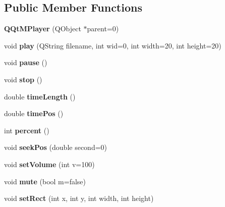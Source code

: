 \subsection*{Public Member Functions}
\begin{DoxyCompactItemize}
\item 
\mbox{\label{class_q_qt_m_player_aa986e3429a00ee30129d2acfa8f0755d}} 
{\bfseries Q\+Qt\+M\+Player} (Q\+Object $\ast$parent=0)
\item 
\mbox{\label{class_q_qt_m_player_a54bbe89b8cd2f477196c92714c36623a}} 
void {\bfseries play} (Q\+String filename, int wid=0, int width=20, int height=20)
\item 
\mbox{\label{class_q_qt_m_player_a7ce620d3dd7f868c1aa1a1f428f3ffcd}} 
void {\bfseries pause} ()
\item 
\mbox{\label{class_q_qt_m_player_a61fed74cc58d450103c36aaa9d53baab}} 
void {\bfseries stop} ()
\item 
\mbox{\label{class_q_qt_m_player_ace58a99a5ade62a254e88027863153e4}} 
double {\bfseries time\+Length} ()
\item 
\mbox{\label{class_q_qt_m_player_aecb7e9e6d47d5a186d29f750ea382ee3}} 
double {\bfseries time\+Pos} ()
\item 
\mbox{\label{class_q_qt_m_player_aec29ddcc6f7f1e64a00a5fb608b2551b}} 
int {\bfseries percent} ()
\item 
\mbox{\label{class_q_qt_m_player_a0639a569c05c3374a6516905f7ac477b}} 
void {\bfseries seek\+Pos} (double second=0)
\item 
\mbox{\label{class_q_qt_m_player_a0a5bbfbd3aeefd720ed79d6a56c32f7c}} 
void {\bfseries set\+Volume} (int v=100)
\item 
\mbox{\label{class_q_qt_m_player_a003fec97b6546e2e2eeb1e45b1702585}} 
void {\bfseries mute} (bool m=false)
\item 
\mbox{\label{class_q_qt_m_player_a8b84fc757447328831fe8fe8b1b105cb}} 
void {\bfseries set\+Rect} (int x, int y, int width, int height)
\end{DoxyCompactItemize}


